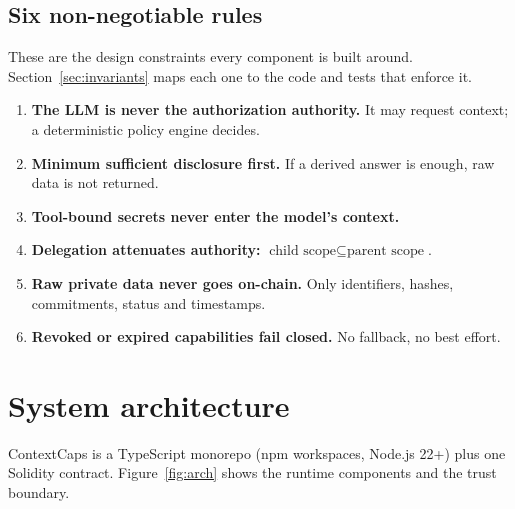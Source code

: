 \documentclass[11pt,a4paper]{article}
\begin{document}
\subsection{Six non-negotiable rules}
These are the design constraints every component is built around. Section~\ref{sec:invariants} maps each one to the code and tests that enforce it.
\begin{enumerate}[label=\textbf{\color{violet}R\arabic*}]
  \item \textbf{The LLM is never the authorization authority.} It may request context; a deterministic policy engine decides.
  \item \textbf{Minimum sufficient disclosure first.} If a derived answer is enough, raw data is not returned.
  \item \textbf{Tool-bound secrets never enter the model's context.}
  \item \textbf{Delegation attenuates authority:} \(\text{child scope} \subseteq \text{parent scope}\).
  \item \textbf{Raw private data never goes on-chain.} Only identifiers, hashes, commitments, status and timestamps.
  \item \textbf{Revoked or expired capabilities fail closed.} No fallback, no best effort.
\end{enumerate}

\section{System architecture}\label{sec:architecture}

ContextCaps is a TypeScript monorepo (npm workspaces, Node.js 22+) plus one Solidity contract. Figure~\ref{fig:arch} shows the runtime components and the trust boundary.
\end{document}
